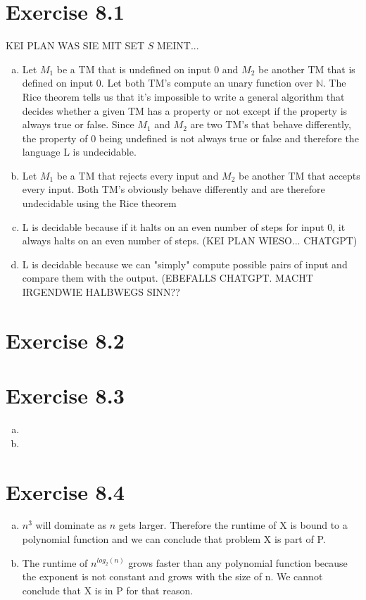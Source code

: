 \documentclass{article} %
\newcommand{\homeworkNumber}{8}
\begin{document}
\section*{Exercise \homeworkNumber.1}

KEI PLAN WAS SIE MIT SET $S$ MEINT...

\begin{enumerate}[(a)]
\item Let $M_1$ be a TM that is undefined on input $0$ and $M_2$ be another TM that is defined on input $0$. Let both TM's compute an unary function over $\mathbb{N}$. The Rice theorem tells us that it's impossible to write a general algorithm that decides whether a given TM has a property or not except if the property is always true or false. Since $M_1$ and $M_2$ are two TM's that behave differently, the property of $0$ being undefined is not always true or false and therefore the language L is undecidable.\\

\item Let $M_1$ be a TM that rejects every input and $M_2$ be another TM that accepts every input. Both TM's obviously behave differently and are therefore undecidable using the Rice theorem\\

\item L is decidable because if it halts on an even number of steps for input 0, it always halts on an even number of steps. (KEI PLAN WIESO... CHATGPT)\\

\item L is decidable because we can "simply" compute possible pairs of input and compare them with the output. (EBEFALLS CHATGPT. MACHT IRGENDWIE HALBWEGS SINN??\\
\end{enumerate}

\section*{Exercise \homeworkNumber.2}


\section*{Exercise \homeworkNumber.3}
\begin{enumerate}[(a)]
\item
\item
\end{enumerate}

\section*{Exercise \homeworkNumber.4}
\begin{enumerate}[(a)]
\item $n^3$ will dominate as $n$ gets larger. Therefore the runtime of X is bound to a polynomial function and we can conclude that problem X is part of P.
\item The runtime of $n^{log_2(n)}$ grows faster than any polynomial function because the exponent is not constant and grows with the size of n. We cannot conclude that X is in P for that reason.
\end{enumerate}
\end{document}
